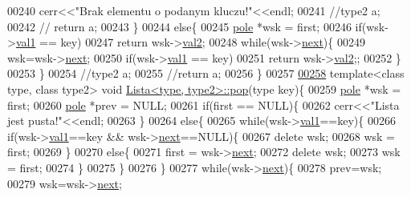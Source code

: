 \begin{DoxyCode}
00240     cerr<<\textcolor{stringliteral}{"Brak elementu o podanym kluczu!"}<<endl;
00241     \textcolor{comment}{//type2 a;}
00242     \textcolor{comment}{// return a;}
00243   \}
00244   \textcolor{keywordflow}{else}\{
00245     \hyperlink{struct_lista_1_1pole}{pole} *wsk = first;
00246     \textcolor{keywordflow}{if}(wsk->\hyperlink{struct_lista_1_1pole_a442b458124564aa83caf2187b433abf7}{val1} == key)
00247       \textcolor{keywordflow}{return} wsk->\hyperlink{struct_lista_1_1pole_acb770478dd0851d399ef62ad7f8fc714}{val2};
00248     \textcolor{keywordflow}{while}(wsk->\hyperlink{struct_lista_1_1pole_affb99c0a72df68fbc83eab9027f7d26e}{next})\{
00249       wsk=wsk->\hyperlink{struct_lista_1_1pole_affb99c0a72df68fbc83eab9027f7d26e}{next};
00250       \textcolor{keywordflow}{if}(wsk->\hyperlink{struct_lista_1_1pole_a442b458124564aa83caf2187b433abf7}{val1} == key)
00251     \textcolor{keywordflow}{return} wsk->\hyperlink{struct_lista_1_1pole_acb770478dd0851d399ef62ad7f8fc714}{val2};;
00252     \}
00253   \}
00254   \textcolor{comment}{//type2 a;}
00255   \textcolor{comment}{//return a;}
00256 \}
00257 
\hypertarget{lista_8hh_source_l00258}{}\hyperlink{class_lista_ac5309fa4e772c9de87abdd0a752bafad}{00258} \textcolor{keyword}{template}<\textcolor{keyword}{class} type, \textcolor{keyword}{class} type2> \textcolor{keywordtype}{void} \hyperlink{class_lista_ac3c0760924a0cae03f837a581640d32b}{Lista<type, type2>::pop}(type key)\{
00259   \hyperlink{struct_lista_1_1pole}{pole} *wsk = first;
00260   \hyperlink{struct_lista_1_1pole}{pole} *prev = NULL;
00261   \textcolor{keywordflow}{if}(first == NULL)\{
00262     cerr<<\textcolor{stringliteral}{"Lista jest pusta!"}<<endl;
00263   \}
00264   \textcolor{keywordflow}{else}\{
00265     \textcolor{keywordflow}{while}(wsk->\hyperlink{struct_lista_1_1pole_a442b458124564aa83caf2187b433abf7}{val1}==key)\{
00266       \textcolor{keywordflow}{if}(wsk->\hyperlink{struct_lista_1_1pole_a442b458124564aa83caf2187b433abf7}{val1}==key && wsk->\hyperlink{struct_lista_1_1pole_affb99c0a72df68fbc83eab9027f7d26e}{next}==NULL)\{
00267     \textcolor{keyword}{delete} wsk;
00268     wsk = first;
00269       \}
00270       \textcolor{keywordflow}{else}\{
00271     first = wsk->\hyperlink{struct_lista_1_1pole_affb99c0a72df68fbc83eab9027f7d26e}{next};
00272     \textcolor{keyword}{delete} wsk;
00273     wsk = first;
00274       \}
00275     \}
00276   \}
00277   \textcolor{keywordflow}{while}(wsk->\hyperlink{struct_lista_1_1pole_affb99c0a72df68fbc83eab9027f7d26e}{next})\{
00278     prev=wsk;
00279     wsk=wsk->\hyperlink{struct_lista_1_1pole_affb99c0a72df68fbc83eab9027f7d26e}{next};

\end{DoxyCode}
